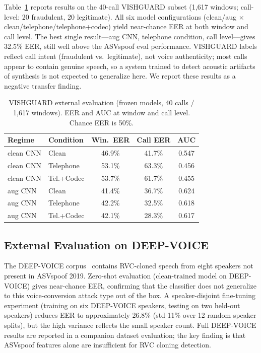 \documentclass[conference]{IEEEtran}
\begin{document}
Table~\ref{tab:vish} reports results on the 40-call VISHGUARD subset (1,617 windows; call-level: 20 fraudulent, 20 legitimate). All six model configurations (clean/aug $\times$ clean/telephone/telephone+codec) yield near-chance EER at both window and call level. The best single result---aug CNN, telephone condition, call level---gives 32.5\% EER, still well above the ASVspoof eval performance. VISHGUARD labels reflect call intent (fraudulent vs.\ legitimate), not voice authenticity; most calls appear to contain genuine speech, so a system trained to detect acoustic artifacts of synthesis is not expected to generalize here. We report these results as a negative transfer finding.

\begin{table}[htbp]
\caption{VISHGUARD external evaluation (frozen models, 40 calls / 1,617 windows). EER and AUC at window and call level. Chance EER is 50\%.}
\begin{center}
\begin{tabular}{llccc}
\toprule
\textbf{Regime} & \textbf{Condition} & \textbf{Win.\ EER} & \textbf{Call EER} & \textbf{AUC}\\
\midrule
clean CNN & Clean          & 46.9\% & 41.7\% & 0.547\\
clean CNN & Telephone      & 53.1\% & 63.3\% & 0.456\\
clean CNN & Tel.+Codec     & 53.7\% & 61.7\% & 0.455\\
aug CNN   & Clean          & 41.4\% & 36.7\% & 0.624\\
aug CNN   & Telephone      & 42.2\% & 32.5\% & 0.618\\
aug CNN   & Tel.+Codec     & 42.1\% & 28.3\% & 0.617\\
\bottomrule
\end{tabular}
\label{tab:vish}
\end{center}
\end{table}

\subsection{External Evaluation on DEEP-VOICE}

The DEEP-VOICE corpus~\cite{deepvoice} contains RVC-cloned speech from eight speakers not present in ASVspoof 2019. Zero-shot evaluation (clean-trained model on DEEP-VOICE) gives near-chance EER, confirming that the classifier does not generalize to this voice-conversion attack type out of the box. A speaker-disjoint fine-tuning experiment (training on six DEEP-VOICE speakers, testing on two held-out speakers) reduces EER to approximately 26.8\% (std 11\% over 12 random speaker splits), but the high variance reflects the small speaker count. Full DEEP-VOICE results are reported in a companion dataset evaluation; the key finding is that ASVspoof features alone are insufficient for RVC cloning detection.
\end{document}
